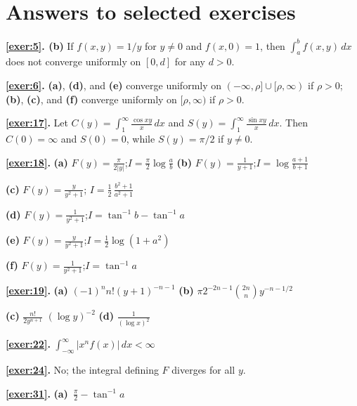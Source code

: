 \documentclass{article}
\newcommand{\dst}{\displaystyle}
\newcounter{exercise}
\begin{document}
\newpage

\bigskip

\section{Answers to selected exercises}\label{section:answers}
\bigskip

\noindent
{\bf\ref{exer:5}. (b)} If $f(x,y)=1/y$  for $y\ne0$  and $f(x,0)=1$, then
$\int_{a}^{b}f(x,y)\,dx$  does not converge uniformly on
$[0,d]$ for any $d>0$.


\bigskip

\noindent
{\bf\ref{exer:6}.}
{\bf(a)}, {\bf(d)}, and {\bf(e)} converge uniformly on
$(-\infty,\rho]\cup[\rho,\infty)$ if $\rho>0$;\, {\bf(b)}, {\bf(c)},
and {\bf(f)}  converge uniformly on $[\rho,\infty)$ if
$\rho>0$.

\bigskip

\noindent
{\bf\ref{exer:17}.}
Let $C(y)=\dst{\int_{1}^{\infty}\frac{\cos xy}{x}\,dx}$ and
 $S(y)=\dst{\int_{1}^{\infty}\frac{\sin xy}{x}\,dx}$. Then
$C(0)=\infty$ and $S(0)=0$, while $S(y)=\pi/2$ if $y\ne0$.


\bigskip

\noindent
{\bf\ref{exer:18}.}
{\bf(a)}
$F(y)=\dst{\frac{\pi}{2|y|}}$;\quad $I=\dst{\frac{\pi}{2}\log\frac{a}{b}}$
\quad
 {\bf(b)} $F(y)=\dst{\frac{1}{y+1}}$;\quad $I=\dst{\log\frac{a+1}{b+1}}$


\bigskip
{\bf(c)}
$F(y)=\dst{\frac{y}{y^{2}+1}}$;\quad
$I=\dst{\frac{1}{2}\,\frac{b^{2}+1}{a^{2}+1}}$


{\bf(d)}
$F(y)=\dst{\frac{1}{y^{2}+1}}$;\quad   $I=\tan^{-1}b-\tan^{-1}a$



{\bf(e)}
$F(y)=\dst{\frac{y}{y^{2}+1}}$;\quad   $I=\dst{\frac{1}{2}}\log(1+a^{2})$


{\bf(f)}
$F(y)=\dst{\frac{1}{y^{2}+1}}$;\quad  $I=\tan^{-1}a$


\bigskip


\noindent
{\bf\ref{exer:19}.}
{\bf(a)} $(-1)^{n}n!(y+1)^{-n-1}$  \quad
{\bf(b)} $\pi2^{-2n-1}\dst{\binom{2n}{n}}y^{-n-1/2}$

{\bf(c)} $\dst{\frac{n!}{2y^{n+1}}}$ $(\log y)^{-2}$
{\bf(d)} $\dst{\frac{1}{(\log x)^{2}}}$

\noindent
{\bf\ref{exer:22}.}
$\dst{\int_{-\infty}^{\infty}|x^{n}f(x)|\,dx<\infty}$


\bigskip
\noindent
{\bf\ref{exer:24}.}
No; the integral defining $F$  diverges for all $y$.


\bigskip

\noindent
{\bf\ref{exer:31}.}
{\bf(a)}\,  $\dst{\frac{\pi}{2}}-\tan^{-1}a$
\end{document}
